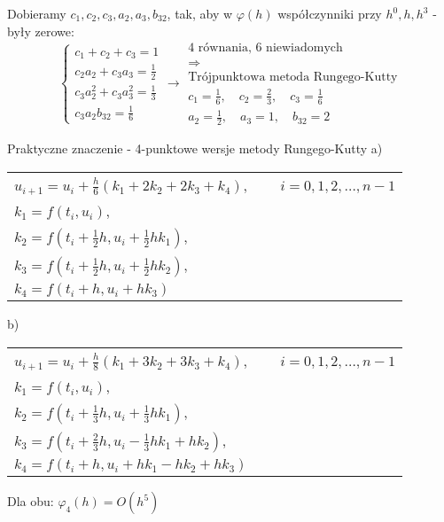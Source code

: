 \begin{frame}
    \begin{center}
    	Dobieramy $c_1,c_2,c_3,a_2,a_3,b_{32}$, tak, aby w $\varphi(h)$ współczynniki przy $h^0,h,h^3$ - były zerowe:
        $$\left\{\begin{array}{l}
        c_1+c_2+c_3 = 1\\
        c_2a_2+c_3a_3 = \frac{1}{2} \\
        c_3a_2^2+c_3a_3^2 = \frac{1}{3} \\
        c_3a_2b_{32} = \frac{1}{6}
        \end{array}\right.\rightarrow\left.\begin{array}{c}
        \text{4 równania, 6 niewiadomych}\\
        \Rightarrow \\
        \text{Trójpunktowa metoda Rungego-Kutty} \\
        c_1 = \frac{1}{6},\quad c_2 = \frac{2}{3}, \quad c_3 = \frac{1}{6} \\
        a_2 = \frac{1}{2},\quad a_3 = 1, \quad b_{32} = 2
        \end{array}\right.$$
    \end{center}
\end{frame}
\begin{frame}{Praktyczne znaczenie - 4-punktowe wersje metody Rungego-Kutty}
	a)
    \begin{center}
    	\begin{tabular}{l}
    		$u_{i+1} = u_i+\frac{h}{6}(k_1+2k_2+2k_3+k_4)$, $\qquad i = 0,1,2, \ldots,n-1$\\
            $k_1 = f(t_i,u_i)$,\\
            $k_2 = f(t_i+\frac{1}{2}h,u_i+\frac{1}{2}hk_1)$,\\
            $k_3 = f(t_i+\frac{1}{2}h,u_i+\frac{1}{2}hk_2)$,\\
            $k_4 = f(t_i+h,u_i+hk_3)$
    	\end{tabular}
    \end{center}
    b) 
      \begin{center}
    	\begin{tabular}{l}
    		$u_{i+1} = u_i+\frac{h}{8}(k_1+3k_2+3k_3+k_4)$, $\qquad i = 0,1,2, \ldots,n-1$\\
            $k_1 = f(t_i,u_i)$,\\
            $k_2 = f(t_i+\frac{1}{3}h,u_i+\frac{1}{3}hk_1)$,\\
            $k_3 = f(t_i+\frac{2}{3}h,u_i-\frac{1}{3}hk_1+hk_2)$,\\
            $k_4 = f(t_i+h,u_i+hk_1-hk_2+hk_3)$
    	\end{tabular}
    \end{center}
  	Dla obu: $\varphi_4(h) = O(h^5)$
\end{frame}
